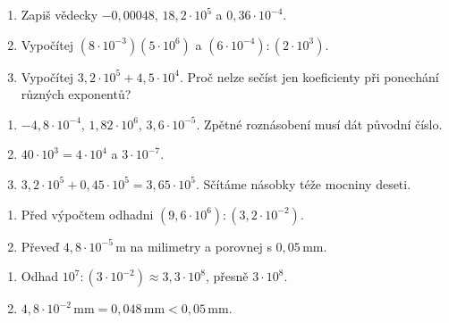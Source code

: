\documentclass[11pt,a4paper]{article}
\begin{document}



\begin{zadaniReseniBox}[title={Základ: normalizace a výpočty},breakable=false]
\begin{enumerate}[label=\alph*)]
\item Zapiš vědecky $-0{,}00048$, $18{,}2\cdot10^5$ a $0{,}36\cdot10^{-4}$.
\item Vypočítej $(8\cdot10^{-3})(5\cdot10^6)$ a $(6\cdot10^{-4}):(2\cdot10^3)$.
\item Vypočítej $3{,}2\cdot10^5+4{,}5\cdot10^4$. Proč nelze sečíst jen koeficienty při ponechání různých exponentů?
\end{enumerate}
\tcblower
\begin{enumerate}[label=\alph*)]
\item $-4{,}8\cdot10^{-4}$, $1{,}82\cdot10^6$, $3{,}6\cdot10^{-5}$. Zpětné roznásobení musí dát původní číslo.
\item $40\cdot10^3=4\cdot10^4$ a $3\cdot10^{-7}$.
\item $3{,}2\cdot10^5+0{,}45\cdot10^5=3{,}65\cdot10^5$. Sčítáme násobky téže mocniny deseti.
\end{enumerate}
\end{zadaniReseniBox}

\begin{zadaniReseniBox}[title={Rezerva: odhad a převod jednotek},breakable=false]
\begin{enumerate}[label=\alph*)]
\item Před výpočtem odhadni $(9{,}6\cdot10^6):(3{,}2\cdot10^{-2})$.
\item Převeď $4{,}8\cdot10^{-5}\,\mathrm m$ na milimetry a porovnej s $0{,}05\,\mathrm{mm}$.
\end{enumerate}
\tcblower
\begin{enumerate}[label=\alph*)]
\item Odhad $10^7:(3\cdot10^{-2})\approx3{,}3\cdot10^8$, přesně $3\cdot10^8$.
\item $4{,}8\cdot10^{-2}\,\mathrm{mm}=0{,}048\,\mathrm{mm}<0{,}05\,\mathrm{mm}$.
\end{enumerate}
\end{zadaniReseniBox}

\end{document}
